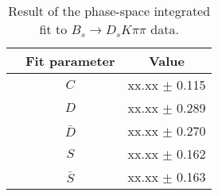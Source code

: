 \begin{table}[h]
\centering
\caption{Result of the phase-space integrated fit to $B_s \to D_s K \pi \pi$ data.}
\begin{tabular}{c c c}
\hline
\hline
& Fit parameter & Value \\
\hline
& $C$ &  xx.xx  $\pm$ 0.115\\
&$D$ &  xx.xx  $\pm$ 0.289\\
&$\bar D$ &  xx.xx  $\pm$ 0.270\\
& $S$ &  xx.xx  $\pm$ 0.162\\
& $\bar S$ &  xx.xx  $\pm$ 0.163\\
\hline
\hline
\end{tabular}
\label{table:timeFit_signal}
\end{table}